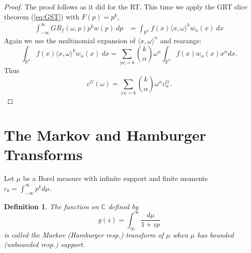 \documentclass{amsart}
\newtheorem{definition}[theorem]{Definition}
\theoremstyle{remark}
\numberwithin{equation}{section}
\newcommand{\tc}{\textcolor{blue}}
\newcommand{\RR}{\mathbb{R}}
\newcommand{\CC}{\mathbb{C}}
\begin{document}
\begin{proof}
The proof follows as it did for the RT. This time we apply the GRT slice theorem (\ref{eq:GST}) with $F(p) = p^k$, 
\begin{align*}
    \int_{-\infty}^\infty GR_f(\omega, p) p^k w(p) ~dp
    &= \int_{\RR^n} f(x) \langle x, \omega \rangle^k w_n(x) ~dx
\end{align*}
Again we use the multinomial expansion of $\langle x, \omega\rangle^n$ and rearange:
\[
    \int_{\RR^n} f(x) \langle x, \omega \rangle^k w_n(x) ~dx
    = \sum_{|\alpha| = k} \binom{k}{\alpha} \omega^\alpha \int_{\RR^n} f(x) w_n(x)x^\alpha dx. 
\]
Thus
\[
    c^G(\omega) = \sum_{|\alpha| = k} \binom{k}{\alpha} \omega^\alpha c^G_\alpha.
\]
\end{proof}


\newpage
\section{The Markov and Hamburger Transforms}
Let $\mu$ be a Borel measure with infinite support and finite moments $c_k = \int_{-\infty}^\infty p^k d\mu$. 

\begin{definition}
The function on $\CC$ defined by
\[
    g(z) = \int_\infty^\infty\frac{d\mu}{1+zp}
\]
is called the Markov (Hamburger resp.) transform of $\mu$ when $\mu$ has bounded (unbounded resp.) support.
\end{definition}
\end{document}

